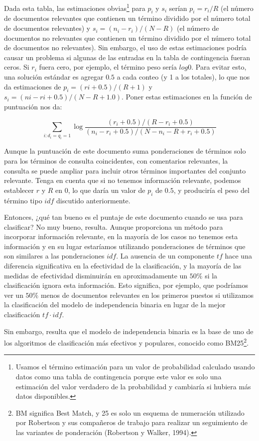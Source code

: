 Dada esta tabla, las estimaciones obvias\footnote{Usamos el término estimación para un valor de probabilidad calculado usando datos como una tabla de contingencia porque este valor es solo una estimación del valor verdadero de la probabilidad y cambiaría si hubiera más datos disponibles.} para $p_i$ y $s_i$ serían $p_i = r_i / R$ (el número de documentos relevantes que contienen un término dividido por el número total de documentos relevantes) y $s_i = (n_i - r_i) / (N - R )$ (el número de documentos no relevantes que contienen un término dividido por el número total de documentos no relevantes). Sin embargo, el uso de estas estimaciones podría causar un problema si algunas de las entradas en la tabla de contingencia fueran ceros. Si $r_i$ fuera cero, por ejemplo, el término peso sería $log{0}$. Para evitar esto, una solución estándar es agregar $0.5$ a cada conteo (y 1 a los totales), lo que nos da estimaciones de $p_i = (ri + 0.5) / (R + 1)$ y $s_i = (ni − ri + 0.5) / (N − R + 1.0)$. Poner estas estimaciones en la función de puntuación nos da:

$$\sum_{i:d_i=q_i=1}\log{\frac{(r_i+0.5)/(R-r_i+0.5)}{(n_i-r_i+0.5)/(N-n_i-R+r_i+0.5)}}$$

Aunque la puntuación de este documento suma ponderaciones de términos solo para los términos de consulta coincidentes, con comentarios relevantes, la consulta se puede ampliar para incluir otros términos importantes del conjunto relevante. Tenga en cuenta que si no tenemos información relevante, podemos establecer $r$ y $R$ en 0, lo que daría un valor de $p_i$ de $0.5$, y produciría el peso del término tipo $idf$ discutido anteriormente.

Entonces, ¿qué tan bueno es el puntaje de este documento cuando se usa para clasificar? No muy bueno, resulta. Aunque proporciona un método para incorporar información relevante, en la mayoría de los casos no tenemos esta información y en su lugar estaríamos utilizando ponderaciones de términos que son similares a las ponderaciones $idf$. La ausencia de un componente $tf$ hace una diferencia significativa en la efectividad de la clasificación, y la mayoría de las medidas de efectividad disminuirán en aproximadamente un $50\%$ si la clasificación ignora esta información. Esto significa, por ejemplo, que podríamos ver un $50\%$ menos de documentos relevantes en los primeros puestos si utilizamos la clasificación del modelo de independencia binaria en lugar de la mejor clasificación $tf\cdot idf$.

Sin embargo, resulta que el modelo de independencia binaria es la base de uno de los algoritmos de clasificación más efectivos y populares, conocido como BM25\footnote{BM significa Best Match, y 25 es solo un esquema de numeración utilizado por Robertson y sus compañeros de trabajo para realizar un seguimiento de las variantes de ponderación (Robertson y Walker, 1994).}.

